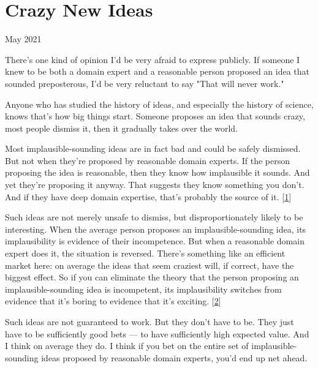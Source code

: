 \chapter{Crazy New Ideas}


            
              
                

May 2021

There's one kind of opinion I'd be very
                  afraid to express publicly. If someone I knew to be both a
                  domain expert and a reasonable person proposed an idea that
                  sounded preposterous, I'd be very reluctant to say "That will
                  never work."

Anyone who has studied the history of
                  ideas, and especially the history of science, knows that's how
                  big things start. Someone proposes an idea that sounds crazy,
                  most people dismiss it, then it gradually takes over the
                  world.

Most implausible-sounding ideas are in fact
                  bad and could be safely dismissed. But not when they're
                  proposed by reasonable domain experts. If the person proposing
                  the idea is reasonable, then they know how implausible it
                  sounds. And yet they're proposing it anyway. That suggests
                  they know something you don't. And if they have deep domain
                  expertise, that's probably the source of it.
                  [\href{\#f1n}{1}]

Such ideas are not merely unsafe to dismiss, but
                  disproportionately likely to be interesting. When the average
                  person proposes an implausible-sounding idea, its
                  implausibility is evidence of their incompetence. But when a
                  reasonable domain expert does it, the situation is reversed.
                  There's something like an efficient market here: on average
                  the ideas that seem craziest will, if correct, have the
                  biggest effect. So if you can eliminate the theory that the
                  person proposing an implausible-sounding idea is incompetent,
                  its implausibility switches from evidence that it's boring to
                  evidence that it's exciting.
                  [\href{\#f2n}{2}]

Such ideas are not guaranteed to work. But they
                  don't have to be. They just have to be sufficiently good bets
                  --- to have sufficiently high expected value. And I think
                  on average they do. I think if you bet on the entire set of
                  implausible-sounding ideas proposed by reasonable domain
                  experts, you'd end up net ahead.

